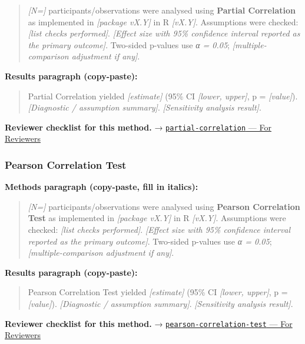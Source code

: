 \documentclass[
]{article}
\begin{document}
\begin{quote}
\emph{{[}N={]}} participants/observations were analysed using
\textbf{Partial Correlation} as implemented in \emph{{[}package vX.Y{]}}
in R \emph{{[}vX.Y{]}}. Assumptions were checked: \emph{{[}list checks
performed{]}}. \emph{{[}Effect size with 95\% confidence interval
reported as the primary outcome{]}}. Two-sided p-values use \emph{α =
0.05}; \emph{{[}multiple-comparison adjustment if any{]}}.
\end{quote}

\textbf{Results paragraph (copy-paste):}

\begin{quote}
Partial Correlation yielded \emph{{[}estimate{]}} (95\% CI
\emph{{[}lower, upper{]}}, p = \emph{{[}value{]}}). \emph{{[}Diagnostic
/ assumption summary{]}}. \emph{{[}Sensitivity analysis result{]}}.
\end{quote}

\textbf{Reviewer checklist for this method.} →
\href{../chapters/07-regression/partial-correlation.Rmd\#for-reviewers}{\texttt{partial-correlation}
--- For Reviewers}

\subsubsection{Pearson Correlation Test}\label{pearson-correlation-test}

\textbf{Methods paragraph (copy-paste, fill in italics):}

\begin{quote}
\emph{{[}N={]}} participants/observations were analysed using
\textbf{Pearson Correlation Test} as implemented in \emph{{[}package
vX.Y{]}} in R \emph{{[}vX.Y{]}}. Assumptions were checked: \emph{{[}list
checks performed{]}}. \emph{{[}Effect size with 95\% confidence interval
reported as the primary outcome{]}}. Two-sided p-values use \emph{α =
0.05}; \emph{{[}multiple-comparison adjustment if any{]}}.
\end{quote}

\textbf{Results paragraph (copy-paste):}

\begin{quote}
Pearson Correlation Test yielded \emph{{[}estimate{]}} (95\% CI
\emph{{[}lower, upper{]}}, p = \emph{{[}value{]}}). \emph{{[}Diagnostic
/ assumption summary{]}}. \emph{{[}Sensitivity analysis result{]}}.
\end{quote}

\textbf{Reviewer checklist for this method.} →
\href{../chapters/04-inferential/pearson-correlation-test.Rmd\#for-reviewers}{\texttt{pearson-correlation-test}
--- For Reviewers}
\end{document}
